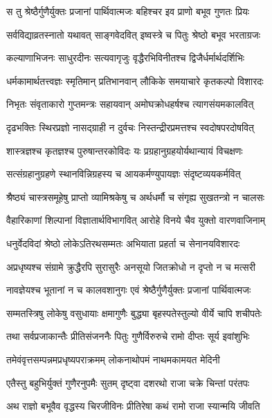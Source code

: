 \twolineshloka
{स तु श्रेष्ठैर्गुणैर्युक्तः प्रजानां पार्थिवात्मजः}
{बहिश्चर इव प्राणो बभूव गुणतः प्रियः} %

\twolineshloka
{सर्वविद्याव्रतस्नातो यथावत् साङ्गवेदवित्}
{इष्वस्त्रे च पितुः श्रेष्ठो बभूव भरताग्रजः} %

\twolineshloka
{कल्याणाभिजनः साधुरदीनः सत्यवागृजुः}
{वृद्धैरभिविनीतश्च द्विजैर्धर्मार्थदर्शिभिः} %

\twolineshloka
{धर्मकामार्थतत्त्वज्ञः स्मृतिमान् प्रतिभानवान्}
{लौकिके समयाचारे कृतकल्पो विशारदः} %

\twolineshloka
{निभृतः संवृताकारो गुप्तमन्त्रः सहायवान्}
{अमोघक्रोधहर्षश्च त्यागसंयमकालवित्} %

\twolineshloka
{दृढभक्तिः स्थिरप्रज्ञो नासद्ग्राही न दुर्वचः}
{निस्तन्द्रीरप्रमत्तश्च स्वदोषपरदोषवित्} %

\twolineshloka
{शास्त्रज्ञश्च कृतज्ञश्च पुरुषान्तरकोविदः}
{यः प्रग्रहानुग्रहयोर्यथान्यायं विचक्षणः} %

\twolineshloka
{सत्संग्रहानुग्रहणे स्थानविन्निग्रहस्य च}
{आयकर्मण्युपायज्ञः संदृष्टव्ययकर्मवित्} %

\twolineshloka
{श्रैष्ठ्यं चास्त्रसमूहेषु प्राप्तो व्यामिश्रकेषु च}
{अर्थधर्मौ च संगृह्य सुखतन्त्रो न चालसः} %

\twolineshloka
{वैहारिकाणां शिल्पानां विज्ञातार्थविभागवित्}
{आरोहे विनये चैव युक्तो वारणवाजिनाम्} %

\twolineshloka
{धनुर्वेदविदां श्रेष्ठो लोकेऽतिरथसम्मतः}
{अभियाता प्रहर्ता च सेनानयविशारदः} %

\twolineshloka
{अप्रधृष्यश्च संग्रामे क्रुद्धैरपि सुरासुरैः}
{अनसूयो जितक्रोधो न दृप्तो न च मत्सरी} %

\twolineshloka
{नावज्ञेयश्च भूतानां न च कालवशानुगः}
{एवं श्रेष्ठैर्गुणैर्युक्तः प्रजानां पार्थिवात्मजः} %

\twolineshloka
{सम्मतस्त्रिषु लोकेषु वसुधायाः क्षमागुणैः}
{बुद्ध्या बृहस्पतेस्तुल्यो वीर्ये चापि शचीपतेः} %

\twolineshloka
{तथा सर्वप्रजाकान्तैः प्रीतिसंजननैः पितुः}
{गुणैर्विरुरुचे रामो दीप्तः सूर्य इवांशुभिः} %

\twolineshloka
{तमेवंवृत्तसम्पन्नमप्रधृष्यपराक्रमम्}
{लोकनाथोपमं नाथमकामयत मेदिनी} %

\twolineshloka
{एतैस्तु बहुभिर्युक्तं गुणैरनुपमैः सुतम्}
{दृष्ट्वा दशरथो राजा चक्रे चिन्तां परंतपः} %

\twolineshloka
{अथ राज्ञो बभूवैव वृद्धस्य चिरजीविनः}
{प्रीतिरेषा कथं रामो राजा स्यान्मयि जीवति} %

